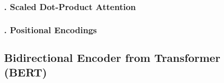 \subsubsection{. Scaled Dot-Product Attention} 
\label{bg:subsub14}


\subsubsection{. Positional Encodings} 
\label{bg:subsub15}





\subsection{Bidirectional Encoder from Transformer (BERT)} 
\label{bg:sub11}

